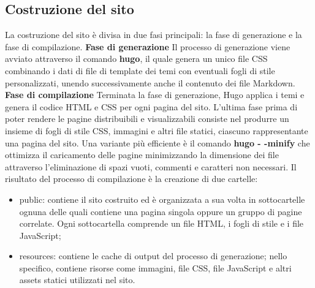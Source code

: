 \documentclass[target=bach,aauheader=]{thud}
\begin{document}
\subsection{Costruzione del sito}
La costruzione del sito è divisa in due fasi principali: la fase di generazione e la fase di compilazione.
\newline
\newline
\textbf{{\fontsize{12}{14}\selectfont Fase di generazione}}
\newline \newline
Il processo di generazione viene avviato attraverso il comando \textbf{hugo}, il quale genera un unico file CSS combinando i dati di file di template dei temi con eventuali fogli di stile personalizzati, unendo successivamente anche il contenuto dei file Markdown.
\newline \newline
\textbf{{\fontsize{12}{14}\selectfont Fase di compilazione}}
\newline \newline
Terminata la fase di generazione, Hugo applica i temi e genera il codice HTML e CSS per ogni pagina del sito. L'ultima fase prima di poter rendere le pagine distribuibili e visualizzabili consiste nel produrre un insieme di fogli di stile CSS, immagini e
altri file statici, ciascuno rappresentante una pagina del sito. 
Una variante più efficiente è il comando \textbf{hugo - -minify} che ottimizza il caricamento delle pagine minimizzando la dimensione dei file attraverso l'eliminazione di spazi vuoti, commenti e caratteri non necessari.
\newline
Il risultato del processo di compilazione è la creazione di due cartelle:
\begin{itemize}
    \item public: contiene il sito costruito ed è organizzata a sua volta in sottocartelle ognuna delle quali contiene una pagina singola oppure un gruppo di pagine correlate. Ogni sottocartella comprende un file HTML, i fogli di stile e i file JavaScript;
    \item resources: contiene le cache di output del processo di generazione; nello specifico, contiene risorse come immagini, file CSS, file JavaScript e altri assets statici utilizzati nel sito.
\end{itemize}

\end{document}
